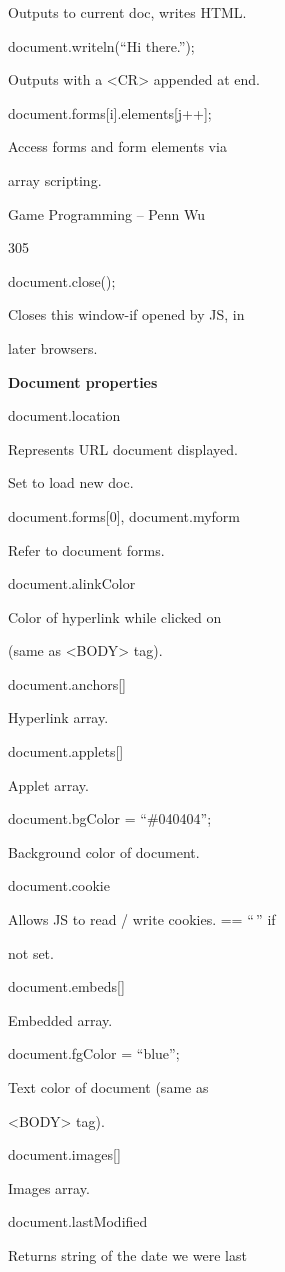 \documentclass[
]{article}
\begin{document}
Outputs to current doc, writes HTML.

document.writeln(``Hi there.'');

Outputs with a \textless CR\textgreater{} appended at end.

document.forms{[}i{]}.elements{[}j++{]};

Access forms and form elements via

array scripting.

Game Programming -- Penn Wu

305

\protect\hypertarget{index_split_015.htmlux5cux23p306}{}{}document.close();

Closes this window-if opened by JS, in

later browsers.

\textbf{Document properties}

document.location

Represents URL document displayed.

Set to load new doc.

document.forms{[}0{]}, document.myform

Refer to document forms.

document.alinkColor

Color of hyperlink while clicked on

(same as \textless BODY\textgreater{} tag).

document.anchors{[}{]}

Hyperlink array.

document.applets{[}{]}

Applet array.

document.bgColor = ``\#040404'';

Background color of document.

document.cookie

Allows JS to read / write cookies. == ``\,'' if

not set.

document.embeds{[}{]}

Embedded array.

document.fgColor = ``blue'';

Text color of document (same as

\textless BODY\textgreater{} tag).

document.images{[}{]}

Images array.

document.lastModified

Returns string of the date we were last
\end{document}
